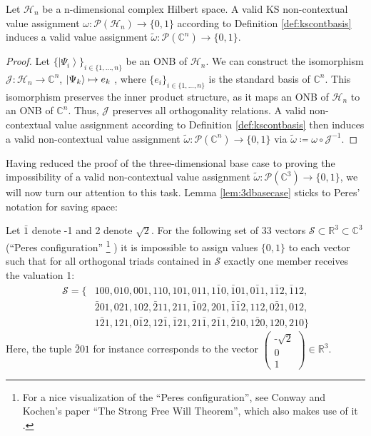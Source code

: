 \begin{lemma}
Let $\mathcal{H}_{n}$ be a n-dimensional complex Hilbert space. A valid KS non-contextual value assignment $\omega:\mathcal{P}(\mathcal{H}_{n})\rightarrow\{0,1\}$ according to Definition \ref{def:kscontbasis} induces a valid value assignment $\tilde{\omega}:\mathcal{P}(\mathbb{C}^{n})\rightarrow\{0,1\}$.
\end{lemma}

\begin{proof}
Let $\{\left|\Psi_{i}\right\rangle \}_{i\in\{1,\dots,n\}}$ be an ONB of $\mathcal{H}_{n}$. We can construct the isomorphism $\mathcal{J}:\mathcal{\mathcal{H}}_{n}\rightarrow\mathbb{C}^{n}$, $\ket{\Psi_{k}} \mapsto e_{k}$ , where $\{e_{i}\}_{i\in\{1,\dots,n\}}$ is the standard basis of $\mathbb{C}^{n}$. This isomorphism preserves the inner product structure, as it maps an ONB of $\mathcal{H}_{n}$ to an ONB of $\mathbb{C}^{n}$. Thus, $\mathcal{J}$ preserves all orthogonality relations. A valid non-contextual value assignment according to Definition \ref{def:kscontbasis} then induces a valid non-contextual value assignment $\tilde{\omega}:\mathcal{P}(\mathbb{C}^{n})\rightarrow\{0,1\}$ via $\tilde{\omega}\coloneqq\omega\circ\mathcal{J}^{-1}$.
\end{proof}

Having reduced the proof of the three-dimensional base case to proving the impossibility of a valid non-contextual value assignment $\tilde{\omega}:\mathcal{P}(\mathbb{C}^{3})\rightarrow\{0,1\}$, we will now turn our attention to this task. Lemma \ref{lem:3dbasecase} sticks to Peres' notation \cite{Peres1991} for saving space:

\begin{lemma}
\label{lem:3dbasecase}
Let $\bar{1}$ denote -1 and 2 denote $\sqrt{2}$. For the following set of 33 vectors $\mathcal{S}\subset\mathbb{R}^{3}\subset\mathbb{C}^{3}$ (“Peres configuration” \footnote{For a nice visualization of the “Peres configuration”, see Conway and Kochen's paper “The Strong Free Will Theorem”, which also makes use of it \cite{Conway2011}.} \cite{Peres1991}) it is impossible to assign values $\{0,1\}$ to each vector such that for all orthogonal triads contained in $\mathcal{S}$ exactly one member receives the valuation 1:
\begin{equation*}
\begin{split}
\mathcal{S}= \{ & 100,010,001,110,101,011,1\bar{1}0,\bar{1}01,0\bar{1}1,1\bar{1}2,\bar{1}12, \\
& \bar{2}01,021,102,\bar{2}11,211,\bar{1}02,201,\bar{1}\bar{1}2,112,0\bar{2}1,012, \\
& 1\bar{2}1,121,0\bar{1}2,12\bar{1},\bar{1}21,21\bar{1},2\bar{1}1,\bar{2}10,1\bar{2}0,120,210\} 
\end{split}
\end{equation*}
Here, the tuple $\bar{2}01$ for instance corresponds to the vector 
$\begin{pmatrix}
\text{-}\sqrt{2}\\
0\\
1
\end{pmatrix}\in\mathbb{R}^{3}.$
\end{lemma}

